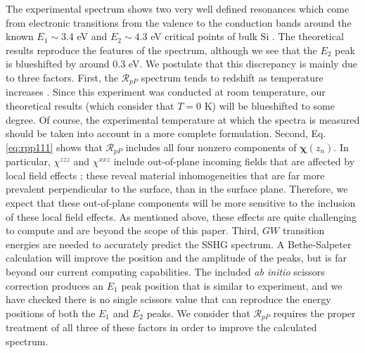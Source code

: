 \documentclass[utf8]{frontiersSCNS}
\begin{document}
The experimental spectrum shows two very well defined resonances which come from
electronic transitions from the valence to the conduction bands around the known
$E_{1}\sim 3.4$ eV and $E_{2}\sim 4.3$ eV critical points of bulk Si
\citep{yubook}. The theoretical results reproduce the features of the spectrum,
although we see that the $E_{2}$ peak is blueshifted by around 0.3 eV. We
postulate that this discrepancy is mainly due to three factors. First, the
$\mathcal{R}_{pP}$ spectrum tends to redshift as temperature increases
\citep{dadapPRB97}. Since this experiment was conducted at room temperature, our
theoretical results (which consider that $T=0$ K) will be blueshifted to some
degree. Of course, the experimental temperature at which the spectra is measured
should be taken into account in a more complete formulation. Second, Eq.
\eqref{eq:rpp111} shows that $\mathcal{R}_{pP}$ includes all four nonzero
components of $\boldsymbol{\chi}(z_{n})$. In particular, $\chi^{zzz}$ and
$\chi^{xxz}$ include out-of-plane incoming fields that are affected by local
field effects \citep{tancognedejean:tel-01235611}; these reveal material
inhomogeneities that are far more prevalent perpendicular to the surface, than
in the surface plane. Therefore, we expect that these out-of-plane components
will be more sensitive to the inclusion of these local field effects. As
mentioned above, these effects are quite challenging to compute
\citep{nicolasPRB15} and are beyond the scope of this paper. Third, $GW$
transition energies are needed to accurately predict the SSHG spectrum. A
Bethe-Salpeter calculation will improve the position and the amplitude of the
peaks, but is far beyond our current computing capabilities. The included
\emph{ab initio} scissors correction produces an $E_{1}$ peak position that is
similar to experiment, and we have checked there is no single scissors value
that can reproduce the energy positions of both the $E_{1}$ and $E_{2}$ peaks.
We consider that $\mathcal{R}_{pP}$ requires the proper treatment of all three
of these factors in order to improve the calculated spectrum.
\end{document}
